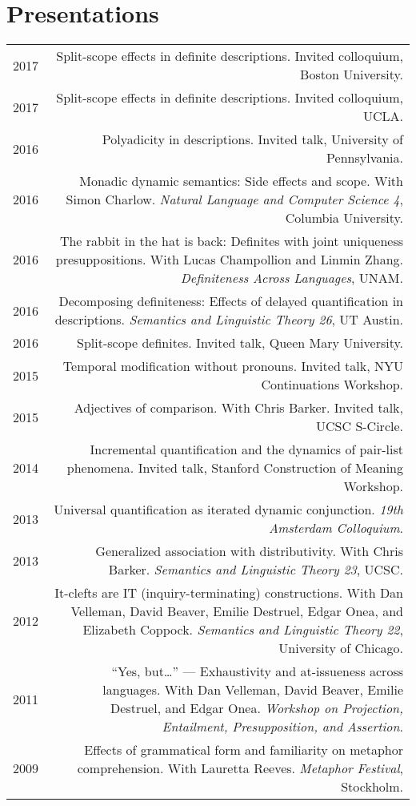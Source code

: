 \documentclass[12pt]{article}
\begin{document}
\medskip

\section*{Presentations}

\begin{longtable}{LR}
  2017 &  Split-scope effects in definite descriptions. Invited colloquium,
          Boston University.\\
  2017 &  Split-scope effects in definite descriptions. Invited colloquium,
          UCLA.\\
  2016 &  Polyadicity in descriptions. Invited talk, University of
          Pennsylvania.\\
  2016 &  Monadic dynamic semantics: Side effects and scope. With Simon
          Charlow. \textit{Natural Language and Computer Science 4}, Columbia
          University.\\
  2016 &  The rabbit in the hat is back: Definites with joint uniqueness
          presuppositions. With Lucas Champollion and Linmin Zhang.
          \textit{Definiteness Across Languages}, UNAM.\\
  2016 &  Decomposing definiteness: Effects of delayed quantification in
          descriptions. \textit{Semantics and Linguistic Theory 26}, UT Austin.\\
  2016 &  Split-scope definites. Invited talk, Queen Mary University.\\
  2015 &  Temporal modification without pronouns. Invited talk, NYU
          Continuations Workshop.\\
  2015 &  Adjectives of comparison. With Chris Barker. Invited talk, UCSC
          S-Circle.\\
  2014 &  Incremental quantification and the dynamics of pair-list phenomena.
          Invited talk, Stanford Construction of Meaning Workshop.\\
  2013 &  Universal quantification as iterated dynamic conjunction. \textit{19th
          Amsterdam Colloquium}. \\
  2013 &  Generalized association with distributivity. With Chris Barker.
          \textit{Semantics and Linguistic Theory 23}, UCSC.\\
  2012 &  It-clefts are IT (inquiry-terminating) constructions. With Dan
          Velleman, David Beaver, Emilie Destruel, Edgar Onea, and Elizabeth
          Coppock. \textit{Semantics and Linguistic Theory 22}, University of
          Chicago.\\
  2011 &  ``Yes, but\dots'' --- Exhaustivity and at-issueness across languages.
           With Dan Velleman, David Beaver, Emilie Destruel, and Edgar Onea.
           \textit{Workshop on Projection, Entailment, Presupposition, and
           Assertion}.\\
  2009 &  Effects of grammatical form and familiarity on metaphor
          comprehension. With Lauretta Reeves. \textit{Metaphor Festival},
          Stockholm.
\end{longtable}
\end{document}
